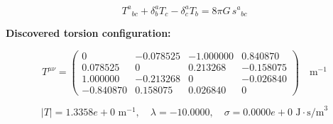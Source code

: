 
\begin{equation}
  T^a{}_{bc} + \delta^a_b T_c - \delta^a_c T_b = 8\pi G \, s^a{}_{bc}
\end{equation}

\textbf{Discovered torsion configuration:}

\begin{equation}
  T^{\mu\nu} = \begin{pmatrix}
    0 & -0.078525 & -1.000000 & 0.840870 \\
    0.078525 & 0 & 0.213268 & -0.158075 \\
    1.000000 & -0.213268 & 0 & -0.026840 \\
    -0.840870 & 0.158075 & 0.026840 & 0
  \end{pmatrix} \quad \text{m}^{-1}
\end{equation}

\begin{equation}
  |T| = 1.3358e+0 \text{ m}^{-1}, \quad
  \lambda = -10.0000, \quad
  \sigma = 0.0000e+0 \text{ J}\cdot\text{s/m}^3
\end{equation}